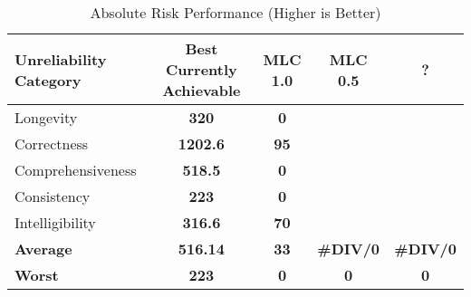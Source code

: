 \begin{table}[h!]
  \caption{Absolute Risk Performance (Higher is Better)}
  \label{tab:absolute-risk-performance}
  \centering
  \begin{tabular}{lcccc}
    \toprule
    \textbf{Unreliability Category} & \textbf{Best Currently Achievable} & \textbf{MLC 1.0} & \textbf{MLC 0.5} & \textbf{?} \\
    \midrule
    Longevity       & \textbf{320}   & \textbf{0}   &           &           \\
    Correctness     & \textbf{1202.6}& \textbf{95}  &           &           \\
    Comprehensiveness & \textbf{518.5}& \textbf{0}  &           &           \\
    Consistency     & \textbf{223}   & \textbf{0}   &           &           \\
    Intelligibility & \textbf{316.6} & \textbf{70}  &           &           \\
    \midrule
    \textbf{Average} & \textbf{516.14} & \textbf{33} & \textbf{\#DIV/0\!} & \textbf{\#DIV/0\!} \\
    \textbf{Worst}   & \textbf{223}   & \textbf{0}   & \textbf{0} & \textbf{0} \\
    \bottomrule
  \end{tabular}
\end{table}
